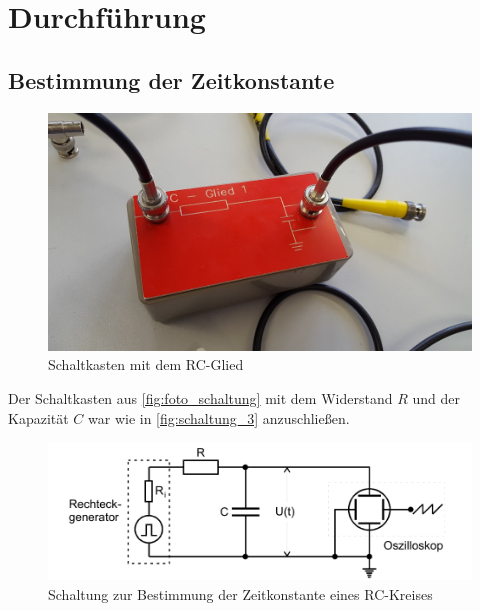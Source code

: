 \section{Durchführung}
\label{sec:Durchführung}


\subsection{Bestimmung der Zeitkonstante}
\label{sec:Durchführung_1}

\begin{figure}
    \centering
    \includegraphics[width=\textwidth/2]{images/foto_schaltung.jpg}
    \caption{Schaltkasten mit dem RC-Glied  \cite{V353}}
    \label{fig:foto_schaltung}
\end{figure}

Der Schaltkasten aus \autoref{fig:foto_schaltung} mit dem Widerstand $R$ und der Kapazität $C$ war wie in \autoref{fig:schaltung_3} anzuschließen.

\begin{figure}
    \centering
    \includegraphics[width=\textwidth/2]{images/schaltung_3.png}
    \caption{Schaltung zur Bestimmung der Zeitkonstante eines RC-Kreises  \cite{V353}}
    \label{fig:schaltung_3}
\end{figure}

